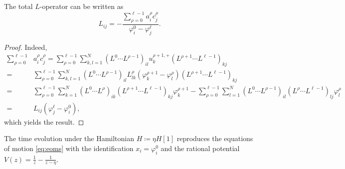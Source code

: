 \begin{lemma}\label{lemma:ratLOp}
    The total $L$-operator can be written as
    \begin{equation}
        L_{ij} = -\frac{\sum_{\rho=0}^{\ell-1} a_i^\rho c_j^\rho}{\varphi_i^0-\varphi_j^\ell}.
\end{equation}
\end{lemma}

\begin{proof}
Indeed,
\begin{equation*}
    \begin{aligned}
        \sum_{\rho=0}^{\ell-1} &a_i^\rho c_j^\rho
        = \sum_{\rho=0}^{\ell-1} \sum_{k,l=1}^N (L^0 \cdots L^{\rho-1})_{il} u_k^{\rho+1,+} (L^{\rho+1} \cdots L^{\ell-1})_{kj} \\
        ={}& \sum_{\rho=0}^{\ell-1} \sum_{k,l=1}^N (L^0 \cdots L^{\rho-1})_{il} L_{lk}^{\rho} (\varphi_k^{\rho+1}-\varphi_l^{\rho}) (L^{\rho+1} \cdots L^{\ell-1})_{kj} \\
        ={}& \sum_{\rho=0}^{\ell-1} \sum_{k=1}^N (L^0 \cdots L^{\rho})_{ik} (L^{\rho+1} \cdots L^{\ell-1})_{kj} \varphi_k^{\rho+1} - \sum_{\rho=0}^{\ell-1} \sum_{l=1}^N (L^0 \cdots L^{\rho-1})_{il} (L^{\rho} \cdots L^{\ell-1})_{lj} \varphi_l^{\rho} \\
        ={}& L_{ij} (\varphi_j^\ell-\varphi_i^0),
    \end{aligned}
\end{equation*}
which yields the result.
\end{proof}

\begin{theorem}
    The time evolution under the Hamiltonian $H \coloneq \eta H[1]$ reproduces the equations of motion \eqref{eq:eoms} with the identification $x_i = \varphi_i^0$ and the rational potential $V(z) = \frac{1}{z}-\frac{1}{z-\eta}$.
\end{theorem}

